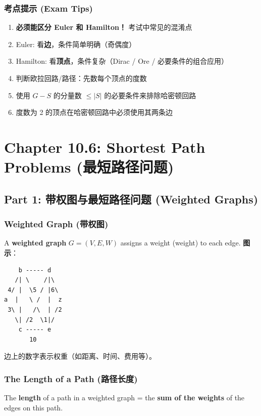 \documentclass[10pt,a4paper,openany]{ctexbook}
\theoremstyle{definition}
\theoremstyle{remark}
\begin{document}
\subsubsection{考点提示 (Exam Tips)}

\begin{enumerate}
\item \textbf{必须能区分 Euler 和 Hamilton！} 考试中常见的混淆点
\item Euler: 看\textbf{边}，条件简单明确（奇偶度）
\item Hamilton: 看\textbf{顶点}，条件复杂（Dirac / Ore / 必要条件的组合应用）
\item 判断欧拉回路/路径：先数每个顶点的度数
\item 使用 $G - S$ 的分量数 $\le |S|$ 的必要条件来排除哈密顿回路
\item 度数为 2 的顶点在哈密顿回路中必须使用其两条边

\end{enumerate}


\section{Chapter 10.6: Shortest Path Problems (最短路径问题)}

\vspace{-2pt}

\subsection{Part 1: 带权图与最短路径问题 (Weighted Graphs)}

\subsubsection{Weighted Graph (带权图)}

A \textbf{weighted graph} $G = (V, E, W)$ assigns a weight (weight) to each edge.
\textbf{图示}：
{\footnotesize\begin{verbatim}
    b ----- d
   /| \    /|\
 4/ |  \5 / |6\
a  |   \ /  |  z
 3\ |   /\  | /2
   \| /2  \1|/
    c ----- e
       10
\end{verbatim}}

边上的数字表示权重（如距离、时间、费用等）。
\subsubsection{The Length of a Path (路径长度)}

The \textbf{length} of a path in a weighted graph = the \textbf{sum of the weights} of the edges on this path.
\end{document}
